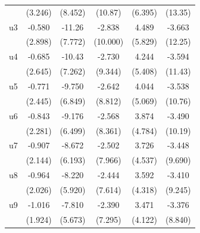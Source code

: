 \begin{table}[htbp]
\begin{tabular}{l*{5}{c}}
                    &     (3.246)         &     (8.452)         &     (10.87)         &     (6.395)         &     (13.35)         \\
\addlinespace
u3                  &      -0.580         &      -11.26         &      -2.838         &       4.489         &      -3.663         \\
                    &     (2.898)         &     (7.772)         &    (10.000)         &     (5.829)         &     (12.25)         \\
\addlinespace
u4                  &      -0.685         &      -10.43         &      -2.730         &       4.244         &      -3.594         \\
                    &     (2.645)         &     (7.262)         &     (9.344)         &     (5.408)         &     (11.43)         \\
\addlinespace
u5                  &      -0.771         &      -9.750         &      -2.642         &       4.044         &      -3.538         \\
                    &     (2.445)         &     (6.849)         &     (8.812)         &     (5.069)         &     (10.76)         \\
\addlinespace
u6                  &      -0.843         &      -9.176         &      -2.568         &       3.874         &      -3.490         \\
                    &     (2.281)         &     (6.499)         &     (8.361)         &     (4.784)         &     (10.19)         \\
\addlinespace
u7                  &      -0.907         &      -8.672         &      -2.502         &       3.726         &      -3.448         \\
                    &     (2.144)         &     (6.193)         &     (7.966)         &     (4.537)         &     (9.690)         \\
\addlinespace
u8                  &      -0.964         &      -8.220         &      -2.444         &       3.592         &      -3.410         \\
                    &     (2.026)         &     (5.920)         &     (7.614)         &     (4.318)         &     (9.245)         \\
\addlinespace
u9                  &      -1.016         &      -7.810         &      -2.390         &       3.471         &      -3.376         \\
                    &     (1.924)         &     (5.673)         &     (7.295)         &     (4.122)         &     (8.840)         \\

\end{tabular}
\end{table}
